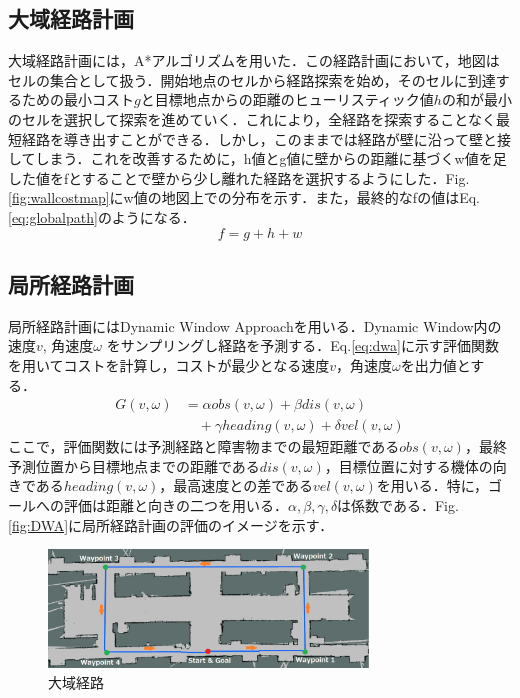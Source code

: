 \documentclass{jarticle}
\begin{document}
\subsection{大域経路計画}
大域経路計画には，A*アルゴリズムを用いた．この経路計画において，地図はセルの集合として扱う．開始地点のセルから経路探索を始め，そのセルに到達するための最小コスト$g$と目標地点からの距離のヒューリスティック値$h$の和が最小のセルを選択して探索を進めていく．これにより，全経路を探索することなく最短経路を導き出すことができる．しかし，このままでは経路が壁に沿って壁と接してしまう．これを改善するために，h値とg値に壁からの距離に基づくw値を足した値をfとすることで壁から少し離れた経路を選択するようにした．Fig.\ref{fig:wallcostmap}にw値の地図上での分布を示す．また，最終的なfの値はEq.\ref{eq:globalpath}のようになる．
\vspace{-3mm}
\begin{equation}
	f = g + h + w
	\label{eq:globalpath}
\end{equation}
\subsection{局所経路計画} 
局所経路計画にはDynamic Window Approachを用いる．Dynamic Window内の速度$v$, 角速度$\omega$ をサンプリングし経路を予測する．Eq.\ref{eq:dwa}に示す評価関数を用いてコストを計算し，コストが最少となる速度$v$，角速度$\omega$を出力値とする．
\vspace{-3mm}
\begin{equation}
	\begin{split}
		G(v, \omega) &= \alpha obs(v, \omega) + \beta dis(v, \omega)\\
		&\quad+ \gamma heading(v, \omega) + \delta vel(v, \omega) 
	    \label{eq:dwa}
	\end{split}
\end{equation}
ここで，評価関数には予測経路と障害物までの最短距離である$obs(v,\omega)$，最終予測位置から目標地点までの距離である$dis(v,\omega)$，目標位置に対する機体の向きである$heading(v,\omega)$，最高速度との差である$vel(v, \omega)$を用いる．特に，ゴールへの評価は距離と向きの二つを用いる．$α,β,γ,δ$は係数である．Fig.\ref{fig:DWA}に局所経路計画の評価のイメージを示す．
\begin{figure}
	\includegraphics[width=8.5cm]{./picture/global_path.png}
	\caption{大域経路}
	\label{fig:globalpath}
\end{figure}
\end{document}
